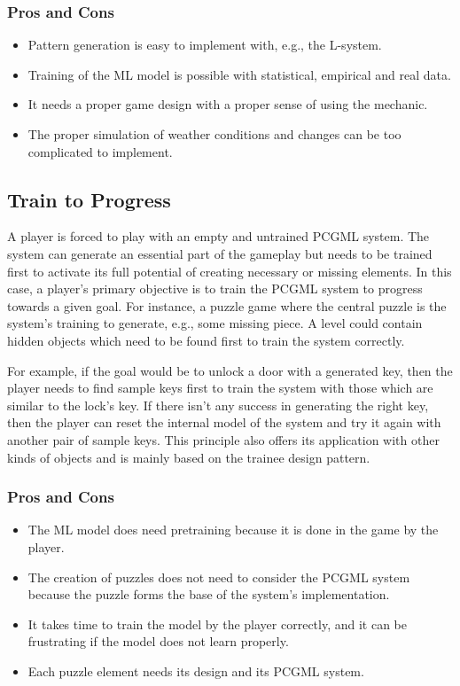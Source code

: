 \documentclass[MGS,Master,english]{twbook}%
\begin{document}
\subsubsection{Pros and Cons}
\begin{itemize}
	\item Pattern generation is easy to implement with, e.g., the L-system.
	\item Training of the \ac{ML} model is possible with statistical, empirical and real data.
	\item It needs a proper game design with a proper sense of using the mechanic.
	\item The proper simulation of weather conditions and changes can be too complicated to implement.
\end{itemize}


\subsection{Train to Progress} \label{idea::trainToProgress}
A player is forced to play with an empty and untrained \ac{PCGML} system. The system can generate an essential part of the gameplay but needs to be trained first to activate its full potential of creating necessary or missing elements. In this case, a player’s primary objective is to train the \ac{PCGML} system to progress towards a given goal. For instance, a puzzle game where the central puzzle is the system’s training to generate, e.g., some missing piece. A level could contain hidden objects which need to be found first to train the system correctly. 

For example, if the goal would be to unlock a door with a generated key, then the player needs to find sample keys first to train the system with those which are similar to the lock's key. If there isn’t any success in generating the right key, then the player can reset the internal model of the system and try it again with another pair of sample keys. This principle also offers its application with other kinds of objects and is mainly based on the trainee design pattern.

\subsubsection{Pros and Cons}
\begin{itemize}
	\item The \ac{ML} model does need pretraining because it is done in the game by the player.
	\item The creation of puzzles does not need to consider the \ac{PCGML} system because the puzzle forms the base of the system's implementation.
	\item It takes time to train the model by the player correctly, and it can be frustrating if the model does not learn properly.
	\item Each puzzle element needs its design and its \ac{PCGML} system.
\end{itemize}
\end{document}
